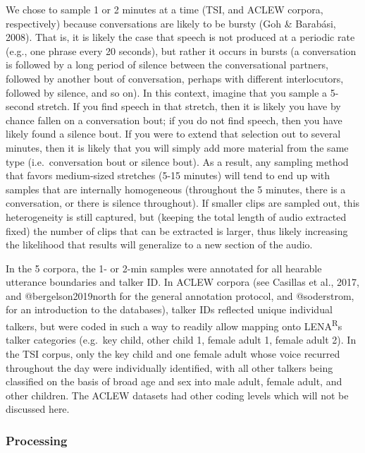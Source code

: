 \documentclass[english,table,man,floatsintext]{apa6}
\begin{document}
We chose to sample 1 or 2 minutes at a time (TSI, and ACLEW corpora, respectively) because conversations are likely to be bursty (Goh \& Barabási, 2008). That is, it is likely the case that speech is not produced at a periodic rate (e.g., one phrase every 20 seconds), but rather it occurs in bursts (a conversation is followed by a long period of silence between the conversational partners, followed by another bout of conversation, perhaps with different interlocutors, followed by silence, and so on). In this context, imagine that you sample a 5-second stretch. If you find speech in that stretch, then it is likely you have by chance fallen on a conversation bout; if you do not find speech, then you have likely found a silence bout. If you were to extend that selection out to several minutes, then it is likely that you will simply add more material from the same type (i.e.~conversation bout or silence bout). As a result, any sampling method that favors medium-sized stretches (5-15 minutes) will tend to end up with samples that are internally homogeneous (throughout the 5 minutes, there is a conversation, or there is silence throughout). If smaller clips are sampled out, this heterogeneity is still captured, but (keeping the total length of audio extracted fixed) the number of clips that can be extracted is larger, thus likely increasing the likelihood that results will generalize to a new section of the audio.

In the 5 corpora, the 1- or 2-min samples were annotated for all hearable utterance boundaries and talker ID. In ACLEW corpora (see Casillas et al., 2017, and @bergelson2019north for the general annotation protocol, and @soderstrom, for an introduction to the databases), talker IDs reflected unique individual talkers, but were coded in such a way to readily allow mapping onto LENA\textsuperscript{R}s talker categories (e.g.~key child, other child 1, female adult 1, female adult 2). In the TSI corpus, only the key child and one female adult whose voice recurred throughout the day were individually identified, with all other talkers being classified on the basis of broad age and sex into male adult, female adult, and other children. The ACLEW datasets had other coding levels which will not be discussed here.

\hypertarget{processing}{%
\subsubsection{Processing}\label{processing}}
\end{document}
